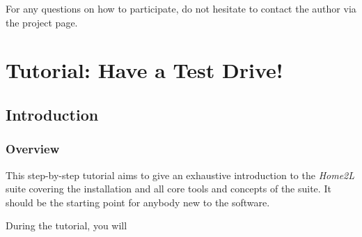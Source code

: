 \documentclass[12pt,english,parskip=half]{scrreprt}
\begin{document}
For any questions on how to participate, do not hesitate to contact the author
via the project page.





%
%
\chapter{Tutorial: Have a Test Drive!}
\label{ch:tutorial}
%
%




\section{Introduction}
\label{sec:tutorial-intro}


\subsection{Overview}

This step-by-step tutorial aims to give an exhaustive introduction to the
\emph{Home2L} suite covering the installation and all core tools and concepts of the suite.
It should be the starting point for anybody new to the software.

During the tutorial, you will
\end{document}
